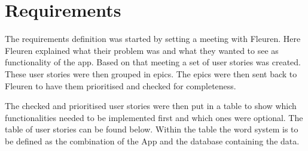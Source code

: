 \section{Requirements\label{sec:Requirements}}
The requirements definition was started by setting a meeting with Fleuren. Here Fleuren explained what their problem was and what they wanted to see as functionality of the app. Based on that meeting a set of user stories was created. These user stories were then grouped in epics. The epics were then sent back to Fleuren to have them prioritised and checked for completeness.

The checked and prioritised user stories were then put in a table to show which functionalities needed to be implemented first and which ones were optional. The table of user stories can be found below. Within the table the word system is to be defined as the combination of the App and the database containing the data.

